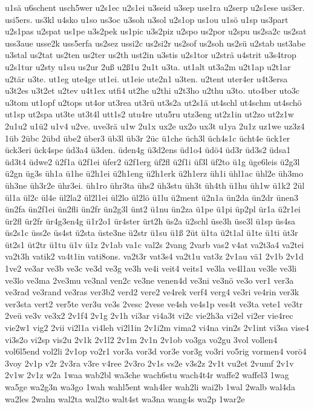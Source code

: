{u1sä
u6schent
usch5wer
u2s1ec
u2s1ei
u3seid
u3sep
use1ra
u2serp
u2s1ese
usi3er.
usi5ers.
us3kl
u4sko
u1so
us3oc
u3soh
u3sol
u2s1op
us1ou
u1sö
u1sp
us3part
u2s1pas
u2spat
us1pe
u3s2pek
us1pic
u3s2piz
u2spo
us2por
u2spu
us2sa2c
us2sat
uss3aue
usse2k
uss5erfa
us2sez
ussi2c
us2si2r
us2sof
us2soh
us2sü
u2stab
ust3abe
u3stal
us2tat
us2ten
us2ter
us2th
ust2in
u3stis
u2s1tor
u2strä
u4strit
u3s4trop
u2s1tur
u2sty
u1su
us2ur
2uß
u2ß1u
2u1t
u3ta.
ut1alt
ut3a2m
u2t1ap
u2t1ar
u2tär
u3te.
ut1eg
ute4ge
ut1ei.
ut1eie
ute2n1
u3ten.
u2tent
uter4er
u4t3ersa
u3t2es
u3t2et
u2tev
u4t1ex
utfi4
ut2he
u2thi
u2t3ho
u2thu
u3to.
uto4ber
uto3c
u3tom
ut1opf
u2tops
ut4or
ut3rea
ut3rü
ut3s2a
ut2s1ä
ut4schl
ut4schm
ut4schö
ut1sp
ut2spa
ut3te
ut3t4l
utt1s2
utu4re
utu5ru
utz3eng
ut2z1in
ut2zo
ut2z1w
2u1u2
u1ü2
u1v4
u2ve.
uve3rä
u1w
2u1x
ux2e
ux2o
ux3t
u1ya
2u1z
uz1we
uz3z4
1üb
2übc
2übd
übe2
über3
üb3l
üb3r
2üc
ü1che
üch3l
üch4s1c
ücht4e
ück1er
ück3eri
ück4spe
üd3a4
ü3den.
üden4g
ü3d2ens
üd1o4
üdö4
üd3r
üd3s2
üdsa1
üd3t4
üdwe2
ü2f1a
ü2f1ei
üfer2
ü2f1erg
üf2fl
ü2f1i
üf3l
üf2to
ü1g
üge6leis
ü2g3l
ü2gn
üg3s
üh1a
ü1he
ü2h1ei
ü2h1eng
ü2h1erk
ü2h1erz
üh1i
ühl1ac
ühl2e
üh3mo
üh3ne
üh3r2e
ühr3ei.
üh1ro
ühr3ta
ühs2
üh3stu
üh3t
üh4th
ü1hu
üh1w
ü1k2
2ül
ül1a
ül2c
ül4e
ül2la2
ül2l1ei
ül2lo
ül2lö
ü1lu
ü2ment
ü2n1a
ün2da
ün2dr
ünen3
ün2fa
ün2f1ei
ün2fli
ün2fr
ün2g3l
ünt2
ü1nu
ün2za
ü1pe
ü1pi
üp2pl
ür1a
ü2r1ei
ür2fl
ür2fr
ür4g3en4g
ü1r2o1
ür4ster
ürt2h
üs2a
ü2schl
üse3h
üse3l
ü1sp
üs4sa
üs2s1c
üss2e
üs4st
ü2sta
üste3ne
ü2str
ü1su
ü1ß
2üt
ü1ta
ü2t1al
ü1te
ü1ti
üt3r
üt2s1
üt2tr
ü1tu
ü1v
ü1z
2v1ab
va1c
val2s
2vang
2varb
vas2
v4at
va2t3a4
va2tei
va2t3h
vatik2
va4t1in
vati8ons.
va2t3r
vat3s4
va2t1u
vat3z
2v1au
vä1
2v1b
2v1d
1ve2
ve3ar
ve3b
ve3c
ve3d
ve3g
ve3h
ve4i
veit4
veits1
ve3la
ve4l1au
ve3le
ve3li
ve3lo
ve3ma
2ve3mu
ve3nal
ven2c
ve3ne
venen4d
ve3ni
ve3nö
ve3o
ver1
ver3a
ve3rad
ve3rand
ve3ras
ver3b2
verd2
vere2
ve4rek
verf4
verg4
ve3ri
ve4rin
ver3k
ver3sta
vert2
ver5te
ver3u
ve3s
2vesc
2vese
ve4sh
ve4s1p
ves4t
ve3ta
vete1
ve3tr
2veü
ve3v
ve3x2
2v1f4
2v1g
2v1h
vi3ar
vi4a3t
vi2c
vie2h3a
vi2el
vi2er
vie4rec
vie2w1
vig2
2vii
vi2l1a
vi4leh
vi2l1in
2v1i2m
vima2
vi4na
vin2s
2v1int
vi3sa
vise4
vi3s2o
vi2sp
vis2u
2v1k
2v1l2
2v1m
2v1n
2v1ob
vo3ga
vo2gu
3vol
vollen4
vol6l5end
vol2li
2v1op
vo2r1
vor3a
vor3d
vor3e
vor3g
vo3ri
vo5rig
vormen4
vorö4
3voy
2v1p
v2r
2v3ra
v3re
v4ree
2v3ro
2v1s
vs2e
v3s2z
2v1t
vu2et
2vumf
2v1v
2v1w
2v1z
w2a
1waa
wab2bl
wa3che
wach6stu
wach4t4r
waffe2
waffel3
1wag
wa5ge
wa2g3n
wa3go
1wah
wahl5ent
wah4ler
wah2li
wai2b
1wal
2walb
wal4da
wa2les
2walm
wal2ta
wal2to
walt4st
wa3na
wang4s
wa2p
1war2e
}

